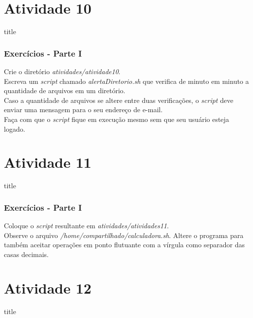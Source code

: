 \documentclass{beamer}
\begin{document}
\section{Atividade 10}
   \begin{frame}
      \begin{beamercolorbox}[sep=8pt,center,shadow=true,rounded=true]{title}
      \insertsectionhead\par%
      \end{beamercolorbox}
   \end{frame}

   \begin{frame}
      \frametitle{Exercícios - Parte I}
      Crie o diretório \textit{atividades/atividade10}. \\
      Escreva um \textit{script} chamado \textit{alertaDiretorio.sh} que verifica de minuto em minuto a quantidade de arquivos em um diretório. \\
      Caso a quantidade de arquivos se altere entre duas verificações, o \textit{script} deve enviar uma mensagem para o seu endereço de e-mail. \\
      Faça com que o \textit{script} fique em execução mesmo sem que seu usuário esteja logado. \\
   \end{frame}

\section{Atividade 11}
   \begin{frame}
      \begin{beamercolorbox}[sep=8pt,center,shadow=true,rounded=true]{title}
      \insertsectionhead\par%
      \end{beamercolorbox}
   \end{frame}

   \begin{frame}
      \frametitle{Exercícios - Parte I}
      Coloque o \textit{script} resultante em \textit{atividades/atividades11}. \\
      Observe o arquivo \textit{/home/compartilhado/calculadora.sh}. Altere o programa para também aceitar operações em ponto flutuante com a vírgula como separador das casas decimais.
   \end{frame}

\section{Atividade 12}
    \begin{frame}
      \begin{beamercolorbox}[sep=8pt,center,shadow=true,rounded=true]{title}
      \insertsectionhead\par%
      \end{beamercolorbox}
   \end{frame}
 
\end{document}

